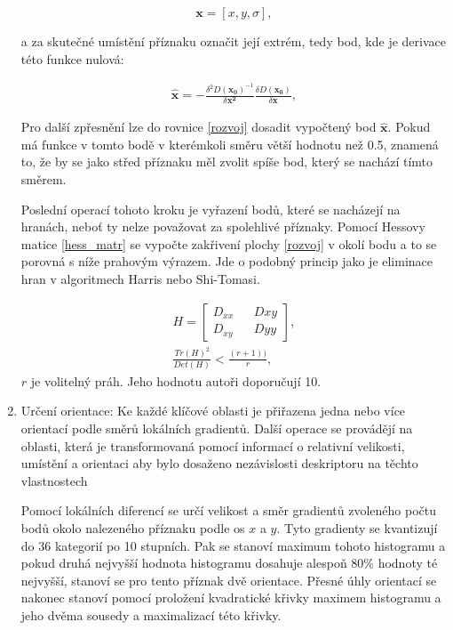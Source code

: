 \begin{enumerate}
			\begin{equation} \mathbf{x} = [x, y, \sigma{}], \end{equation}
	
			a za skutečné umístění příznaku označit její extrém, tedy bod, kde je derivace této funkce nulová:
			
			\begin{align}
			\mathbf{\hat{x}} = - \frac{\delta{}^2 D(\mathbf{x_0})^{-1}}{\delta{}\mathbf{x^2}}
			\frac{\delta D(\mathbf{x_0})}{\delta \mathbf{x}},
			\end{align}
			
			Pro další zpřesnění lze do rovnice \ref{rozvoj} dosadit vypočtený bod $\hat{\mathbf{x}}$. Pokud má funkce v tomto bodě v kterémkoli směru větší hodnotu než 0.5, znamená to, že by se jako střed příznaku měl zvolit spíše bod, který se nachází tímto směrem.
			
			Poslední operací tohoto kroku je vyřazení bodů, které se nacházejí na hranách, neboť ty nelze považovat za spolehlivé příznaky. Pomocí Hessovy matice \ref{hess_matr} se vypočte zakřivení plochy \ref{rozvoj} v okolí bodu a to se porovná s níže prahovým výrazem. Jde o podobný princip jako je eliminace hran v algoritmech Harris nebo Shi-Tomasi.
			
			\begin{align}
			\label{hess_matr}
			H = \begin{bmatrix}
			D_{xx} && D{xy} \\
			D_{xy} && D{yy}
			\end{bmatrix},\\
			\frac{Tr(H)^2}{Det(H)} < \frac{(r+1))}{r},
			\end{align}
			$r$ je volitelný práh. Jeho hodnotu  autoři \cite{lowe2004distinctive} doporučují 10.
			
								
		\item Určení orientace: Ke každé klíčové oblasti je přiřazena jedna nebo více orientací podle směrů lokálních gradientů. Další operace se provádějí na oblasti, která je transformovaná pomocí informací o relativní velikosti, umístění a orientaci aby bylo dosaženo nezávislosti deskriptoru na těchto  vlastnostech
		
			Pomocí lokálních diferencí se určí velikost a směr gradientů zvoleného počtu bodů okolo nalezeného příznaku podle os $x$ a $y$. Tyto gradienty se kvantizují do 36 kategorií po 10 stupních. Pak se stanoví maximum tohoto histogramu a pokud druhá nejvyšší hodnota histogramu dosahuje alespoň 80\% hodnoty té nejvyšší, stanoví se pro tento příznak dvě orientace. Přesné úhly orientací se nakonec stanoví pomocí proložení kvadratické křivky maximem histogramu a jeho dvěma sousedy a maximalizací této křivky.	
					

\end{enumerate}
